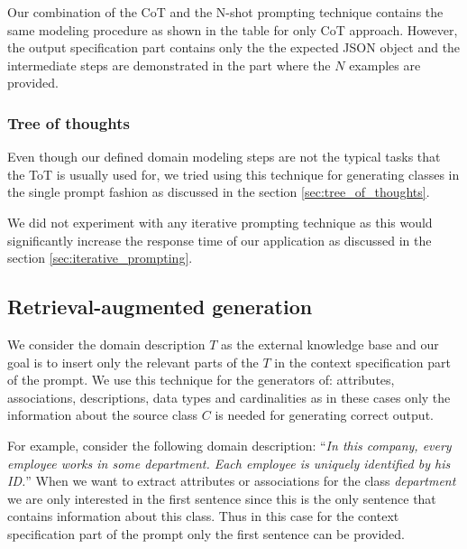 Our combination of the CoT and the N-shot prompting technique contains the same modeling procedure as shown in the table for only CoT approach. However, the output specification part contains only the the expected JSON object and the intermediate steps are demonstrated in the part where the $N$ examples are provided.


\subsubsection{Tree of thoughts}

Even though our defined domain modeling steps are not the typical tasks that the ToT is usually used for, we tried using this technique for generating classes in the single prompt fashion as discussed in the section \ref{sec:tree_of_thoughts}.

We did not experiment with any iterative prompting technique as this would significantly increase the response time of our application as discussed in the section \ref{sec:iterative_prompting}.



\subsection{Retrieval-augmented generation}

We consider the domain description $T$ as the external knowledge base and our goal is to insert only the relevant parts of the $T$ in the context specification part of the prompt. We use this technique for the generators of: attributes, associations, descriptions, data types and cardinalities as in these cases only the information about the source class $C$ is needed for generating correct output.

For example, consider the following domain description: ``\textit{In this company, every employee works in some department. Each employee is uniquely identified by his ID.}'' When we want to extract attributes or associations for the class \textit{department} we are only interested in the first sentence since this is the only sentence that contains information about this class. Thus in this case for the context specification part of the prompt only the first sentence can be provided.

